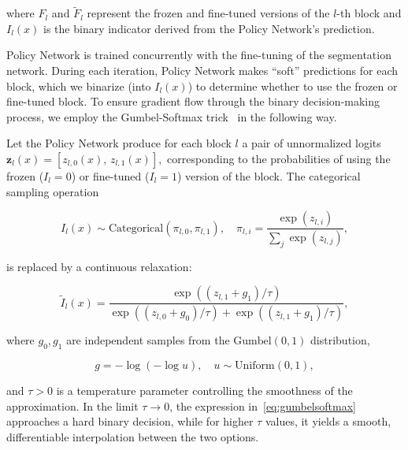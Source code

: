 \noindent
where $F_l$ and $\tilde{F}_l$ represent the frozen and fine-tuned versions of the $l$-th block and $I_l(x)$ is the binary indicator derived from the Policy Network’s prediction.

Policy Network is trained concurrently with the fine-tuning of the segmentation network. During each iteration, Policy Network makes ``soft'' predictions for each block, which we binarize (into $I_l(x)$) to determine whether to use the frozen or fine-tuned block. To ensure gradient flow through the binary decision-making process, we employ the Gumbel-Softmax trick~\cite{jang2017categorical} in the following way.%


Let the Policy Network produce for each block $l$ a pair of unnormalized logits $\mathbf{z}_l(x) = [z_{l,0}(x),\, z_{l,1}(x)],$ corresponding to the probabilities of using the frozen ($I_l=0$) or fine-tuned ($I_l=1$) version of the block. The categorical sampling operation

\[
I_l(x) \sim \mathrm{Categorical}(\pi_{l,0}, \pi_{l,1}), \quad
\pi_{l,i} = \frac{\exp(z_{l,i})}{\sum_{j} \exp(z_{l,j})},
\]

\noindent
is replaced by a continuous relaxation:

\begin{equation}
	\tilde{I}_l(x) =
	\frac{
		\exp\!\left((z_{l,1} + g_1)/\tau\right)
	}{
		\exp\!\left((z_{l,0} + g_0)/\tau\right) +
		\exp\!\left((z_{l,1} + g_1)/\tau\right)
	},
	\label{eq:gumbelsoftmax}
\end{equation}

\noindent
where $g_0, g_1$ are independent samples from the $\mathrm{Gumbel}(0,1)$ distribution,

\[ g = -\log(-\log u), \quad u \sim \mathrm{Uniform}(0,1), \]

\noindent
and $\tau > 0$ is a temperature parameter controlling the smoothness of the approximation. In the limit $\tau \to 0$, the expression in~\eqref{eq:gumbelsoftmax} approaches a hard binary decision, while for higher $\tau$ values, it yields a smooth, differentiable interpolation between the two options. %


